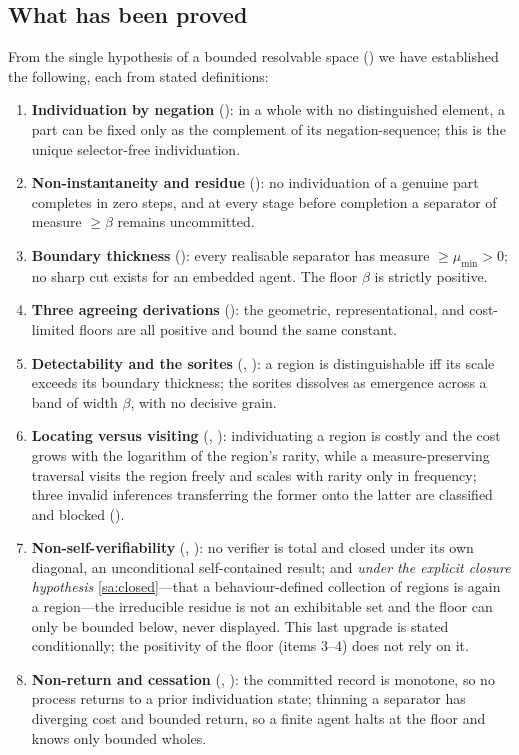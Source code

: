 \documentclass[11pt,a4paper]{article}
\theoremstyle{thmstyle}
\theoremstyle{definition}
\theoremstyle{remark}
\newcommand{\thick}{\beta}
\begin{document}
\subsection{What has been proved}

From the single hypothesis of a bounded resolvable space () we have
established the following, each from stated definitions:

\begin{enumerate}[label=(\arabic*),leftmargin=2.4em]
\item \textbf{Individuation by negation} (): in a whole
with no distinguished element, a part can be fixed only as the complement of its
negation-sequence; this is the unique selector-free individuation.
\item \textbf{Non-instantaneity and residue} (): no
individuation of a genuine part completes in zero steps, and at every stage before
completion a separator of measure $\ge\thick$ remains uncommitted.
\item \textbf{Boundary thickness} (): every realisable
separator has measure $\ge\mu_{\min}>0$; no sharp cut exists for an embedded
agent. The floor $\thick$ is strictly positive.
\item \textbf{Three agreeing derivations} (): the
geometric, representational, and cost-limited floors are all positive and bound
the same constant.
\item \textbf{Detectability and the sorites} (,
): a region is distinguishable iff its scale exceeds its
boundary thickness; the sorites dissolves as emergence across a band of width
$\thick$, with no decisive grain.
\item \textbf{Locating versus visiting} (,
): individuating a region is costly and the cost grows
with the logarithm of the region's rarity, while a measure-preserving traversal
visits the region freely and scales with rarity only in frequency; three invalid
inferences transferring the former onto the latter are classified and blocked
().
\item \textbf{Non-self-verifiability} (,
): no verifier is total and closed under its own
diagonal, an unconditional self-contained result; and \emph{under the explicit
closure hypothesis} \ref{sa:closed}---that a behaviour-defined collection of
regions is again a region---the irreducible residue is not an exhibitable set and
the floor can only be bounded below, never displayed. This last upgrade is stated
conditionally; the positivity of the floor (items 3--4) does not rely on it.
\item \textbf{Non-return and cessation} (,
): the committed record is monotone, so no process returns to
a prior individuation state; thinning a separator has diverging cost and bounded
return, so a finite agent halts at the floor and knows only bounded wholes.
\end{enumerate}
\end{document}
